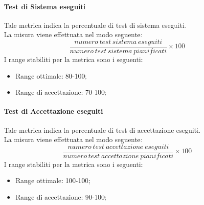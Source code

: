 			\paragraph{Test di Sistema eseguiti}
			Tale metrica indica la percentuale di test di sistema eseguiti.
			\\La misura viene effettuata nel modo seguente:
				\begin{equation}
					\frac{numero~test~sistema~eseguiti}{numero~test~sistema~pianificati}\times100
				\end{equation}
			I range stabiliti per la metrica sono i seguenti:
				\begin{itemize}
					\item Range ottimale: 80-100;
					\item Range di accettazione: 70-100;
				\end{itemize}
				
			\paragraph{Test di Accettazione eseguiti}
			Tale metrica indica la percentuale di test di accettazione eseguiti.
			\\La misura viene effettuata nel modo seguente:
				\begin{equation}
					\frac{numero~test~accettazione~eseguiti}{numero~test~accettazione~pianificati}\times100
				\end{equation}
			I range stabiliti per la metrica sono i seguenti:
				\begin{itemize}
					\item Range ottimale: 100-100;
					\item Range di accettazione: 90-100;
				\end{itemize}
				
